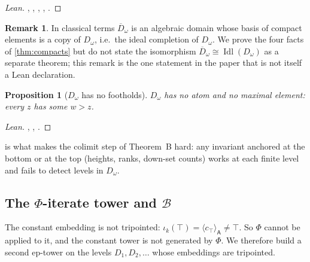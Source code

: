 \documentclass[11pt]{amsart}
\theoremstyle{plain}
\newtheorem{proposition}[theorem]{Proposition}
\theoremstyle{definition}
\newtheorem{remark}[theorem]{Remark}
\newcommand{\cst}[1]{c_{#1}}
\newcommand{\tg}[2]{\langle #1\rangle_{\mathsf{#2}}}
\newcommand{\Dc}{D_\omega}
\newcommand{\Db}{\overline{D}_\omega}
\newcommand{\BB}{\mathcal{B}}
\newcommand{\iso}{\cong}
\begin{document}
\begin{proof}[Lean]
,
,
,
,
.
\end{proof}

\begin{remark}
In classical terms $\Db$ is an algebraic domain whose basis of compact elements
is a copy of $\Dc$, i.e.\ the ideal completion of $\Dc$. We prove the four
facts of \cref{thm:compacts} but do not state the isomorphism
$\Db\iso\operatorname{Idl}(\Dc)$ as a separate theorem; this remark is the one
statement in the paper that is not itself a Lean declaration.
\end{remark}

\begin{proposition}[$\Dc$ has no footholds]\label{prop:nofootholds}
$\Dc$ has no atom and no maximal element: every $z$ has some $w>z$.
\end{proposition}
\begin{proof}[Lean]
, ,
.
\end{proof}

 is what makes the colimit step of Theorem~B hard: any
invariant anchored at the bottom or at the top (heights, ranks, down-set
counts) works at each finite level and fails to detect levels in $\Dc$.

\subsection{The \texorpdfstring{$\Phi$}{Phi}-iterate tower and \texorpdfstring{$\BB$}{B}}

The constant embedding is not tripointed: $\iota_k(\top)=\tg{\cst\top}A\neq
\top$. So $\Phi$ cannot be applied to it, and the constant tower is not
generated by $\Phi$. We therefore build a second ep-tower on the levels
$D_1,D_2,\dots$ whose embeddings are tripointed.
\end{document}
